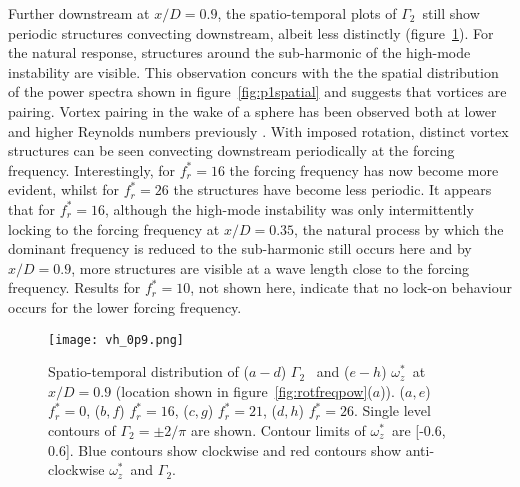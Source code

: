 \documentclass[3p]{elsarticle}
\newcommand{\freqrat}{\ensuremath{f_r^*}}
\newcommand{\gtwo}{\ensuremath{\Gamma_2}}
\newcommand{\wz}{\ensuremath{\omega_z^*}}
\begin{document}
Further downstream at $x/D=0.9$, the spatio-temporal plots of \gtwo~still show periodic structures convecting downstream, albeit less distinctly (figure~\ref{fig:vh_0p9}). For the natural
response, structures around the sub-harmonic of the
high-mode instability are visible. This observation concurs with the
the spatial distribution of the power spectra shown in
figure~\ref{fig:p1spatial} and suggests that vortices are pairing. Vortex pairing in the wake of a sphere has been observed both at lower and higher Reynolds numbers previously \citep[e.g.,][]{Rodriguez2011,Bakic2006}. With imposed rotation, distinct vortex structures can be seen convecting
downstream periodically at the forcing frequency. Interestingly, for $\freqrat=16$ the forcing
frequency has now become more evident, whilst for $\freqrat=26$ the
structures have become less periodic. It appears that for
$\freqrat=16$, although the high-mode instability was only
intermittently locking to the forcing frequency at $x/D=0.35$, the
natural process by which the dominant frequency is reduced to the
sub-harmonic still occurs here and by $x/D=0.9$, more structures are
visible at a wave length close to the forcing frequency. Results for $\freqrat=10$, not shown here, indicate that no lock-on behaviour occurs for the lower forcing frequency.
 

%
\begin{figure}
	\centering
	\texttt{[image: vh\_0p9.png]}
	\caption{Spatio-temporal distribution of ($a-d$) \gtwo~ and
		($e-h$) \wz~at $x/D=0.9$ (location shown in
		figure~\ref{fig:rotfreqpow}($a$)). ($a,e$)
		$\freqrat=0$, ($b,f$) $\freqrat=16$, ($c,g$)
		$\freqrat=21$, ($d,h$) $\freqrat=26$. Single level
		contours of $\gtwo= \pm 2/\pi$ are shown. Contour limits of
		\wz~are [-0.6, 0.6]. Blue contours show clockwise and red contours show anti-clockwise \wz~and \gtwo.}
	\label{fig:vh_0p9}
\end{figure}
%
\end{document}
